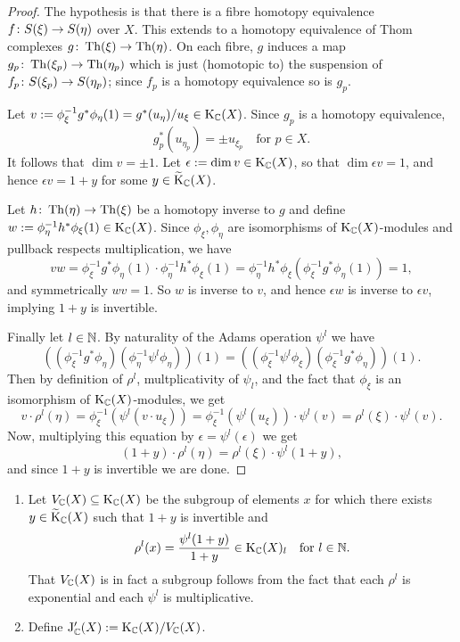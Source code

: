 \begin{proof}
  The hypothesis is that there is a fibre homotopy equivalence $f \colon
  S(\xi) \to S(\eta)$ over $X$. This extends to a homotopy equivalence
  of Thom complexes $g \colon \operatorname{Th}(\xi) \to \operatorname{Th}(\eta)$. On each fibre, $g$
  induces a map $g_p \colon \operatorname{Th}(\xi_p) \to \operatorname{Th}(\eta_p)$ which is just
  (homotopic to) the suspension of $f_p \colon S(\xi_p) \to S(\eta_p)$;
  since $f_p$ is a homotopy equivalence so is $g_p$.

  Let $v \mathrel{:=} \phi_\xi^{-1}g^*\phi_\eta(1) = g^*(u_\eta)/u_\xi \in
  \mathrm{K}_{\mathbb{C}}(X)$. Since $g_p$ is a homotopy equivalence,
  \[
  g_p^*(u_{\eta_p}) = \pm u_{\xi_p} \quad \text{for }p \in X.
  \]
  It follows that $\dim v = \pm 1$. Let $\epsilon \mathrel{:=} \dim v \in
  \mathrm{K}_{\mathbb{C}}(X)$, so that $\dim \epsilon v = 1$, and hence $\epsilon v = 1
  + y$ for some $y \in \widetilde{\mathrm{K}}_{\mathbb{C}}(X)$.

  Let $h \colon \operatorname{Th}(\eta) \to \operatorname{Th}(\xi)$ be a homotopy inverse to $g$ and
  define $w \mathrel{:=} \phi_\eta^{-1}h^*\phi_\xi(1) \in \mathrm{K}_{\mathbb{C}}(X)$. Since
  $\phi_\xi,\phi_\eta$ are isomorphisms of $\mathrm{K}_{\mathbb{C}}(X)$-modules and
  pullback respects multiplication, we have
  \[
  vw = \phi_\xi^{-1}g^*\phi_\eta(1) \cdot
  \phi_\eta^{-1}h^*\phi_\xi(1) =
  \phi_\eta^{-1}h^*\phi_\xi(\phi_\xi^{-1}g^*\phi_\eta(1)) = 1,
  \]
  and symmetrically $wv = 1$. So $w$ is inverse to $v$, and hence
  $\epsilon w$ is inverse to $\epsilon v$, implying $1+y$ is
  invertible.

  Finally let $l \in \mathbb{N}$. By naturality of the Adams operation
  $\psi^l$ we have
  \[
  ((\phi_\xi^{-1}g^*\phi_\eta)(\phi_\eta^{-1}\psi^l\phi_\eta))(1) =
  ((\phi_\xi^{-1}\psi^l\phi_\xi)(\phi_\xi^{-1}g^*\phi_\eta))(1).
  \]
  Then by definition of $\rho^l$, multplicativity of $\psi_l$, and the
  fact that $\phi_\xi$ is an isomorphism of $\mathrm{K}_{\mathbb{C}}(X)$-modules, we get
  \[
  v \cdot \rho^l(\eta) = \phi_\xi^{-1}(\psi^l(v \cdot u_\xi)) =
  \phi_\xi^{-1}(\psi^l(u_\xi)) \cdot \psi^l(v) = \rho^l(\xi) \cdot
  \psi^l(v).
  \]
  Now, multiplying this equation by $\epsilon = \psi^l(\epsilon)$ we
  get
  \[
  (1+y) \cdot \rho^l(\eta) = \rho^l(\xi) \cdot \psi^l(1+y),
  \]
  and since $1+y$ is invertible we are done.
\end{proof}

\begin{definitions}
  \label{jprime}
  \begin{enumerate}[leftmargin=*]
  \item Let $V_{\mathbb{C}}(X) \subseteq \mathrm{K}_{\mathbb{C}}(X)$ be the subgroup of elements
    $x$ for which there exists $y \in \widetilde{\mathrm{K}}_{\mathbb{C}}(X)$ such that $1+y$ is
    invertible and
    \begin{equation}
      \label{jprime-y}
      \rho^l(x) = \frac{\psi^l(1+y)}{1+y} \in \mathrm{K}_{\mathbb{C}}(X)_l \quad \text{for
      } l \in \mathbb{N}.
    \end{equation}
    That $V_{\mathbb{C}}(X)$ is in fact a subgroup
    follows from the fact that each $\rho^l$ is exponential and each
    $\psi^l$ is multiplicative.
  \item Define $\mathrm{J}_{\mathbb{C}}'(X) \mathrel{:=} \mathrm{K}_{\mathbb{C}}(X)/V_{\mathbb{C}}(X)$.
  \end{enumerate}
\end{definitions}

